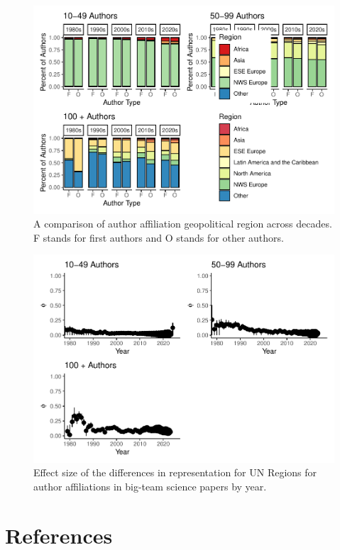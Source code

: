 \documentclass[
  man]{apa7}
\begin{document}
\begin{figure}
\centering
\includegraphics{manuscript_scopus_files/figure-latex/author-gpe-figure-1.pdf}
\caption{\label{fig:author-gpe-figure}A comparison of author affiliation geopolitical region across decades. F stands for first authors and O stands for other authors.}
\end{figure}

\begin{figure}
\centering
\includegraphics{manuscript_scopus_files/figure-latex/effect-gpe-figure-1.pdf}
\caption{\label{fig:effect-gpe-figure}Effect size of the differences in representation for UN Regions for author affiliations in big-team science papers by year.}
\end{figure}

\newpage

\hypertarget{references}{%
\section{References}\label{references}}
\end{document}

